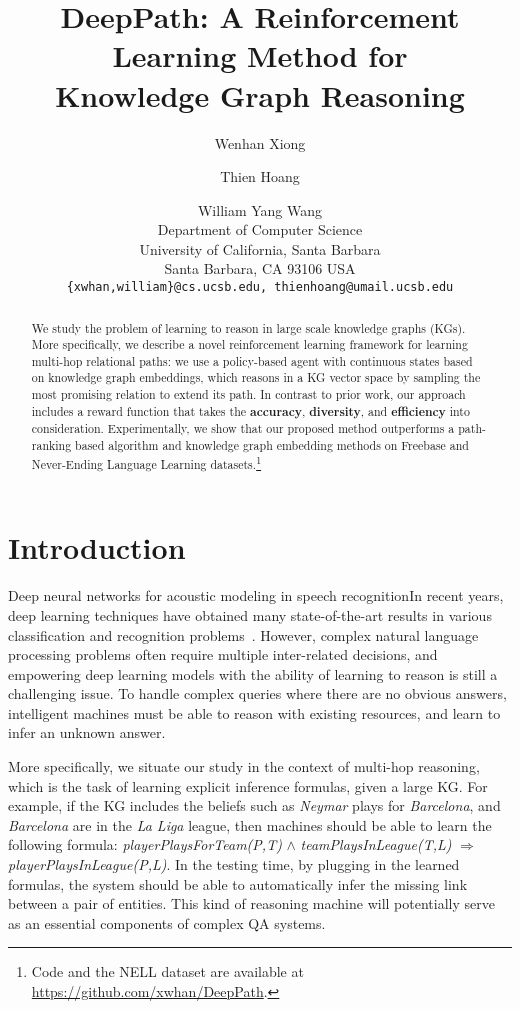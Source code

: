 \documentclass[11pt,letterpaper]{article}
\title{DeepPath: A Reinforcement Learning Method for\\ Knowledge Graph Reasoning}
\author{Wenhan Xiong \and Thien Hoang \and  William Yang Wang\\
   Department of Computer Science\\
   University of California, Santa Barbara\\
   Santa Barbara, CA 93106 USA\\
  {\tt \{xwhan,william\}@cs.ucsb.edu, thienhoang@umail.ucsb.edu}}
\date{}
\begin{document}
\maketitle
\begin{abstract}
We study the problem of learning to reason in large scale knowledge graphs (KGs). More specifically, we describe a novel reinforcement learning framework for learning multi-hop relational paths: we use a policy-based agent with continuous states based on knowledge graph embeddings, which reasons in a KG vector space by sampling the most promising relation to extend its path. In contrast to prior work, our approach includes a reward function that takes the \textbf{accuracy}, \textbf{diversity}, and \textbf{efficiency} into consideration. Experimentally, we show that our proposed method outperforms a path-ranking based algorithm and knowledge graph embedding methods on Freebase and Never-Ending Language Learning datasets.\footnote{Code and the NELL dataset are available at \url{https://github.com/xwhan/DeepPath}.}
\end{abstract}


\section{Introduction}

Deep neural networks for acoustic modeling in speech recognitionIn recent years, deep learning techniques have obtained many state-of-the-art results in various classification and recognition problems~\cite{krizhevsky2012imagenet,hinton2012deep,kim2014convolutional}. However, complex natural language processing problems often require multiple inter-related decisions, and empowering deep learning models with the ability of learning to reason is still a challenging issue.  To handle complex queries where there are no obvious answers, intelligent machines must be able to reason with existing resources, and learn to infer an unknown answer. 

More specifically, we situate our study in the context of multi-hop reasoning, which is the task of learning explicit inference formulas, given a large KG. For example, if the KG includes the beliefs such as \emph{Neymar} plays for \emph{Barcelona}, and \emph{Barcelona} are in the \emph{La Liga} league, then machines should be able to learn the following formula: 
\emph{playerPlaysForTeam(P,T)} $\land$ \emph{teamPlaysInLeague(T,L)} $\Rightarrow$ \emph{playerPlaysInLeague(P,L)}.
In the testing time, by plugging in the learned formulas, the system should be able to automatically infer the missing link between a pair of entities. This kind of reasoning machine will potentially serve as an essential components of complex QA systems.
\end{document}
